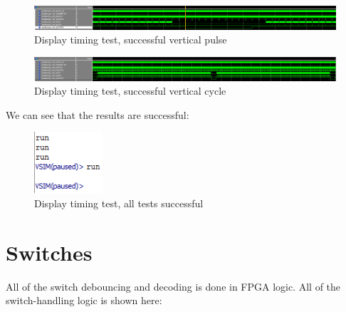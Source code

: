 \begin{figure}[ht!]
    \centering
    \includegraphics[width=6in]{timing/VRAM-test/display-success-vert-pulse.png}
		\caption{Display timing test, successful vertical pulse}
\end{figure}

\begin{figure}[ht!]
    \centering
    \includegraphics[width=6in]{timing/VRAM-test/display-success-full-vert.png}
		\caption{Display timing test, successful vertical cycle}
\end{figure}

We can see that the results are successful:

\begin{figure}[ht!]
    \centering
    \includegraphics[width=1in]{timing/VRAM-test/display-success-full-output.png}
		\caption{Display timing test, all tests successful}
\end{figure}

\section{Switches}

All of the switch debouncing and decoding is done in FPGA logic. All of the switch-handling logic is shown here:

